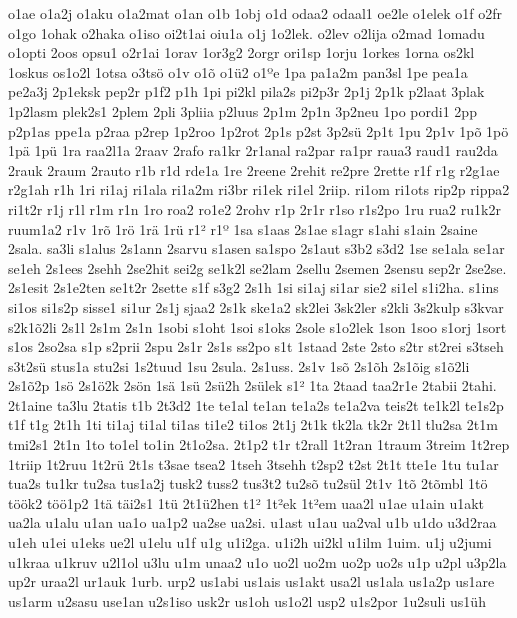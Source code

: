{o1ae
o1a2j
o1aku
o1a2mat
o1an
o1b
1obj
o1d
odaa2
odaal1
oe2le
o1elek
o1f
o2fr
o1go
1ohak
o2haka
o1iso
oi2t1ai
oiu1a
o1j
1o2lek.
o2lev
o2lija
o2mad
1omadu
o1opti
2oos
opsu1
o2r1ai
1orav
1or3g2
2orgr
ori1sp
1orju
1orkes
1orna
os2kl
1oskus
os1o2l
1otsa
o3ts^^f6
o1v
o1^^f5
o1^^fc2
o1^^bae
1pa
pa1a2m
pan3sl
1pe
pea1a
pe2a3j
2p1eksk
pep2r
p1f2
p1h
1pi
pi2kl
pila2s
pi2p3r
2p1j
2p1k
p2laat
3plak
1p2lasm
plek2s1
2plem
2pli
3pliia
p2luus
2p1m
2p1n
3p2neu
1po
pordi1
2pp
p2p1as
ppe1a
p2raa
p2rep
1p2roo
1p2rot
2p1s
p2st
3p2s^^fc
2p1t
1pu
2p1v
1p^^f5
1p^^f6
1p^^e4
1p^^fc
1ra
raa2l1a
2raav
2rafo
ra1kr
2r1anal
ra2par
ra1pr
raua3
raud1
rau2da
2rauk
2raum
2rauto
r1b
r1d
rde1a
1re
2reene
2rehit
re2pre
2rette
r1f
r1g
r2g1ae
r2g1ah
r1h
1ri
ri1aj
ri1ala
ri1a2m
ri3br
ri1ek
ri1el
2riip.
ri1om
ri1ots
rip2p
rippa2
ri1t2r
r1j
r1l
r1m
r1n
1ro
roa2
ro1e2
2rohv
r1p
2r1r
r1so
r1s2po
1ru
rua2
ru1k2r
ruum1a2
r1v
1r^^f5
1r^^f6
1r^^e4
1r^^fc
r1^^b2
r1^^ba
1sa
s1aas
2s1ae
s1agr
s1ahi
s1ain
2saine
2sala.
sa3li
s1alus
2s1ann
2sarvu
s1asen
sa1spo
2s1aut
s3b2
s3d2
1se
se1ala
se1ar
se1eh
2s1ees
2sehh
2se2hit
sei2g
se1k2l
se2lam
2sellu
2semen
2sensu
sep2r
2se2se.
2s1esit
2s1e2ten
se1t2r
2sette
s1f
s3g2
2s1h
1si
si1aj
si1ar
sie2
si1el
s1i2ha.
s1ins
si1os
si1s2p
sisse1
si1ur
2s1j
sjaa2
2s1k
ske1a2
sk2lei
3sk2ler
s2kli
3s2kulp
s3kvar
s2k1^^f52li
2s1l
2s1m
2s1n
1sobi
s1oht
1soi
s1oks
2sole
s1o2lek
1son
1soo
s1orj
1sort
s1os
2so2sa
s1p
s2prii
2spu
2s1r
2s1s
ss2po
s1t
1staad
2ste
2sto
s2tr
st2rei
s3tseh
s3t2s^^fc
stus1a
stu2si
1s2tuud
1su
2sula.
2s1uss.
2s1v
1s^^f5
2s1^^f5h
2s1^^f5ig
s1^^f52li
2s1^^f52p
1s^^f6
2s1^^f62k
2s^^f6n
1s^^e4
1s^^fc
2s^^fc2h
2s^^fclek
s1^^b2
1ta
2taad
taa2r1e
2tabii
2tahi.
2t1aine
ta3lu
2tatis
t1b
2t3d2
1te
te1al
te1an
te1a2s
te1a2va
teis2t
te1k2l
te1s2p
t1f
t1g
2t1h
1ti
ti1aj
ti1al
ti1as
ti1e2
ti1os
2t1j
2t1k
tk2la
tk2r
2t1l
tlu2sa
2t1m
tmi2s1
2t1n
1to
to1el
to1in
2t1o2sa.
2t1p2
t1r
t2rall
1t2ran
1traum
3treim
1t2rep
1triip
1t2ruu
1t2r^^fc
2t1s
t3sae
tsea2
1tseh
3tsehh
t2sp2
t2st
2t1t
tte1e
1tu
tu1ar
tua2s
tu1kr
tu2sa
tus1a2j
tusk2
tuss2
tus3t2
tu2s^^f5
tu2s^^fcl
2t1v
1t^^f5
2t^^f5mbl
1t^^f6
t^^f6^^f6k2
t^^f6^^f61p2
1t^^e4
t^^e4i2s1
1t^^fc
2t1^^fc2hen
t1^^b2
1t^^b2ek
1t^^b2em
uaa2l
u1ae
u1ain
u1akt
ua2la
u1alu
u1an
ua1o
ua1p2
ua2se
ua2si.
u1ast
u1au
ua2val
u1b
u1do
u3d2raa
u1eh
u1ei
u1eks
ue2l
u1elu
u1f
u1g
u1i2ga.
u1i2h
ui2kl
u1ilm
1uim.
u1j
u2jumi
u1kraa
u1kruv
u2l1ol
u3lu
u1m
unaa2
u1o
uo2l
uo2m
uo2p
uo2s
u1p
u2pl
u3p2la
up2r
uraa2l
ur1auk
1urb.
urp2
us1abi
us1ais
us1akt
usa2l
us1ala
us1a2p
us1are
us1arm
u2sasu
use1an
u2s1iso
usk2r
us1oh
us1o2l
usp2
u1s2por
1u2suli
us1^^fch
}
